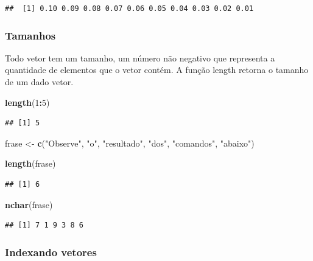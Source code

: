 \documentclass[
]{book}
\newenvironment{Shaded}{\begin{snugshade}}{\end{snugshade}}
\newcommand{\DecValTok}[1]{\textcolor[rgb]{0.00,0.00,0.81}{#1}}
\newcommand{\FunctionTok}[1]{\textcolor[rgb]{0.13,0.29,0.53}{\textbf{#1}}}
\newcommand{\NormalTok}[1]{#1}
\newcommand{\OtherTok}[1]{\textcolor[rgb]{0.56,0.35,0.01}{#1}}
\newcommand{\SpecialCharTok}[1]{\textcolor[rgb]{0.81,0.36,0.00}{\textbf{#1}}}
\newcommand{\StringTok}[1]{\textcolor[rgb]{0.31,0.60,0.02}{#1}}
\begin{document}
\begin{verbatim}
##  [1] 0.10 0.09 0.08 0.07 0.06 0.05 0.04 0.03 0.02 0.01
\end{verbatim}

\subsubsection{Tamanhos}\label{tamanhos}

Todo vetor tem um tamanho, um número não negativo que representa a quantidade de elementos que o vetor contém.
A função length retorna o tamanho de um dado vetor.

\begin{Shaded}
\begin{Highlighting}[]
\FunctionTok{length}\NormalTok{(}\DecValTok{1}\SpecialCharTok{:}\DecValTok{5}\NormalTok{) }
\end{Highlighting}
\end{Shaded}

\begin{verbatim}
## [1] 5
\end{verbatim}

\begin{Shaded}
\begin{Highlighting}[]
\NormalTok{frase }\OtherTok{\textless{}{-}} \FunctionTok{c}\NormalTok{(}\StringTok{"Observe"}\NormalTok{, }\StringTok{"o"}\NormalTok{, }\StringTok{"resultado"}\NormalTok{, }\StringTok{"dos"}\NormalTok{, }\StringTok{"comandos"}\NormalTok{, }\StringTok{"abaixo"}\NormalTok{)}

\FunctionTok{length}\NormalTok{(frase)}
\end{Highlighting}
\end{Shaded}

\begin{verbatim}
## [1] 6
\end{verbatim}

\begin{Shaded}
\begin{Highlighting}[]
\FunctionTok{nchar}\NormalTok{(frase)}
\end{Highlighting}
\end{Shaded}

\begin{verbatim}
## [1] 7 1 9 3 8 6
\end{verbatim}

\subsubsection{Indexando vetores}\label{indexando-vetores}
\end{document}
